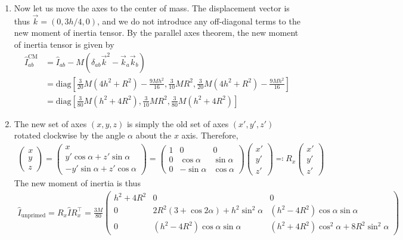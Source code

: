 \documentclass{article}
\theoremstyle{definition}
\newcommand{\al}{\alpha}
\newcommand{\f}[2]{\frac{#1}{#2}}
\newcommand{\lp}{\left(}
\newcommand{\rp}{\right)}
\newcommand{\lb}{\left[}
\newcommand{\rb}{\right]}
\begin{document}
\begin{enumerate}[label=(\alph*)]
	\item Now let us move the axes to the center of mass. The displacement vector is thus $\vec{k} = (0,3h/4,0)$, and we do not introduce any off-diagonal terms to the new moment of inertia tensor. By the parallel axes theorem, the new moment of inertia tensor is given by
	\begin{align*}
	\hat I^{\text{CM}}_{ab} &= \hat{I}_{ab} - M\lp \delta_{ab} \vec{k}^2 - \vec{k}_a \vec{k}_b \rp \\
	&= \text{diag}\lb \f{3}{20}M(4h^2 + R^2) - \f{9Mh^2}{16}, \f{3}{10}MR^2,  \f{3}{20}M(4h^2 + R^2) -\f{9Mh^2}{16}\rb \\ 
	&= \boxed{\text{diag}\lb \f{3}{80}M(h^2 + 4R^2), \f{3}{10}MR^2,  \f{3}{80}M(h^2 + 4R^2)\rb}
	\end{align*}
	
	
	
	\item The new set of axes $(x,y,z)$ is simply the old set of axes $(x',y',z')$ rotated clockwise by the angle $\al$ about the $x$ axis. Therefore, 
	\begin{align*}
	\begin{pmatrix}
	x\\y\\z
	\end{pmatrix}
	= 
	\begin{pmatrix}
	x \\ y'\cos\al + z'\sin\al  \\ -y'\sin\al + z'\cos\al 
	\end{pmatrix}
	= \begin{pmatrix}
	1 & 0 & 0\\
	0 & \cos\al& \sin\al \\
	0 & -\sin\al & \cos\al
	\end{pmatrix}
	\begin{pmatrix}
	x'\\y'\\z'
	\end{pmatrix} \eqqcolon R_x \begin{pmatrix}
	x'\\y'\\z'
	\end{pmatrix}
	\end{align*}
	The new moment of inertia is thus
	\begin{align*}
	\boxed{\hat I_{\text{unprimed}} = R_x \hat I R_x^\top = 
	\f{3M}{80}\begin{pmatrix}
	h^2+4R^2&0 &0 \\
	0& 2R^2(3+\cos 2\al) + h^2 \sin^2\al& (h^2-4R^2)\cos\al \sin\al \\
	0&(h^2-4R^2)\cos\al \sin\al& (h^2+4R^2)\cos^2\al + 8R^2\sin^2\al
	\end{pmatrix}}
	\end{align*}
	

\end{enumerate}
\end{document}

